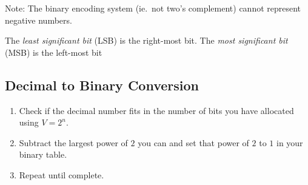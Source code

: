 \begin{note}
	Note: The binary encoding system (ie.\ not two's complement) cannot represent negative numbers.
\end{note}

The \emph{least significant bit} (LSB) is the right-most bit.
The \emph{most significant bit} (MSB) is the left-most bit

\subsection{Decimal to Binary Conversion}\label{sub:decimal_to_binary_conversion}

\begin{enumerate}
	\item Check if the decimal number fits in the number of bits you have allocated using \(V=2^n\).
	\item Subtract the largest power of \(2\) you can and set that power of \(2\) to \(1\) in your binary table.
	\item Repeat until complete.
\end{enumerate}

